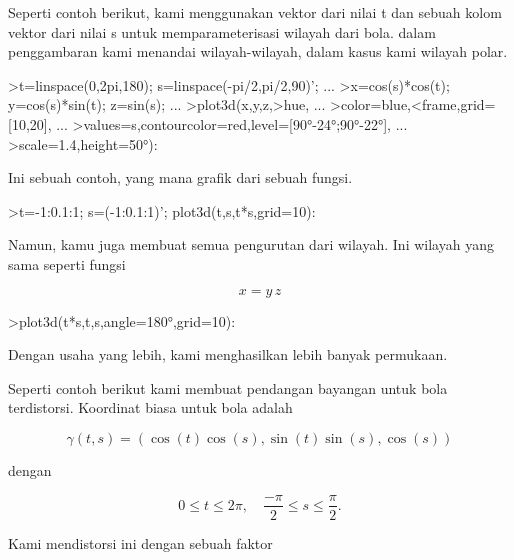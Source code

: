 \documentclass[a4paper,10pt]{article}
\begin{document}
\begin{eulernotebook}
\begin{eulercomment}
Seperti contoh berikut, kami menggunakan vektor dari nilai t dan
sebuah kolom vektor dari nilai s untuk memparameterisasi wilayah dari
bola. dalam penggambaran kami menandai wilayah-wilayah, dalam kasus
kami wilayah polar.
\end{eulercomment}
\begin{eulerprompt}
>t=linspace(0,2pi,180); s=linspace(-pi/2,pi/2,90)'; ...
>x=cos(s)*cos(t); y=cos(s)*sin(t); z=sin(s); ...
>plot3d(x,y,z,>hue, ...
>color=blue,<frame,grid=[10,20], ...
>values=s,contourcolor=red,level=[90°-24°;90°-22°], ...
>scale=1.4,height=50°):
\end{eulerprompt}
\begin{eulercomment}
Ini sebuah contoh, yang mana grafik dari sebuah fungsi.
\end{eulercomment}
\begin{eulerprompt}
>t=-1:0.1:1; s=(-1:0.1:1)'; plot3d(t,s,t*s,grid=10):
\end{eulerprompt}
\begin{eulercomment}
Namun, kamu juga membuat semua pengurutan dari wilayah. Ini wilayah
yang sama seperti fungsi

\end{eulercomment}
\begin{eulerformula}
\[
x = y \, z
\]
\end{eulerformula}
\begin{eulerprompt}
>plot3d(t*s,t,s,angle=180°,grid=10):
\end{eulerprompt}
\begin{eulercomment}
Dengan usaha yang lebih, kami menghasilkan lebih banyak permukaan.

Seperti contoh berikut kami membuat pendangan bayangan untuk bola
terdistorsi. Koordinat biasa untuk bola adalah

\end{eulercomment}
\begin{eulerformula}
\[
\gamma(t,s) = (\cos(t)\cos(s),\sin(t)\sin(s),\cos(s))
\]
\end{eulerformula}
\begin{eulercomment}
dengan

\end{eulercomment}
\begin{eulerformula}
\[
0 \le t \le 2\pi, \quad \frac{-\pi}{2} \le s \le \frac{\pi}{2}.
\]
\end{eulerformula}
\begin{eulercomment}
Kami mendistorsi ini dengan sebuah faktor


\end{eulercomment}
\end{eulernotebook}
\end{document}
